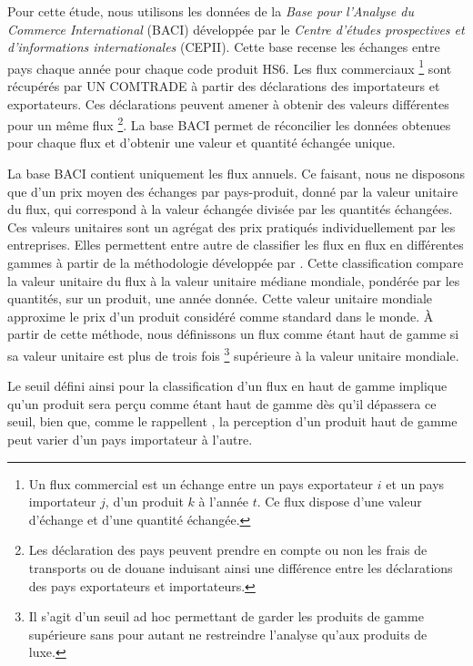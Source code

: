 \documentclass[french,10pt,a4paper]{article}
\begin{document}
\bigskip

Pour cette étude, nous utilisons les données de la \textit{Base pour l'Analyse du Commerce International} (BACI) \citep{Gaulier2010} développée par le \textit{Centre d'études prospectives et d'informations internationales} (CEPII). Cette base recense les échanges entre pays chaque année pour chaque code produit HS6. Les flux commerciaux \footnote{Un flux commercial est un échange entre un pays exportateur $i$ et un pays importateur $j$, d'un produit $k$ à l'année $t$. Ce flux dispose d'une valeur d'échange et d'une quantité échangée.} sont récupérés par UN COMTRADE à partir des déclarations des importateurs et exportateurs. Ces déclarations peuvent amener à obtenir des valeurs différentes pour un même flux \footnote{Les déclaration des pays peuvent prendre en compte ou non les frais de transports ou de douane induisant ainsi une différence entre les déclarations des pays exportateurs et importateurs.}. La base BACI permet de réconcilier les données obtenues pour chaque flux et d'obtenir une valeur et quantité échangée unique.

La base BACI contient uniquement les flux annuels. Ce faisant, nous ne disposons que d'un prix moyen des échanges par pays-produit, donné par la valeur unitaire du flux, qui correspond à la valeur échangée divisée par les quantités échangées. Ces valeurs unitaires sont un agrégat des prix pratiqués individuellement par les entreprises. Elles permettent entre autre de classifier les flux en flux en différentes gammes à partir de la méthodologie développée par \cite{Fontagne1997}. Cette classification compare la valeur unitaire du flux à la valeur unitaire médiane mondiale, pondérée par les quantités, sur un produit, une année donnée. Cette valeur unitaire mondiale approxime le prix d'un produit considéré comme standard dans le monde. À partir de cette méthode, nous définissons un flux comme étant haut de gamme si sa valeur unitaire est plus de trois fois \footnote{Il s'agit d'un seuil ad hoc permettant de garder les produits de gamme supérieure sans pour autant ne restreindre l'analyse qu'aux produits de luxe.} supérieure à la valeur unitaire mondiale. 

Le seuil défini ainsi pour la classification d'un flux en haut de gamme implique qu'un produit sera perçu comme étant haut de gamme dès qu'il dépassera ce seuil, bien que, comme le rappellent \cite{Martin2015}, la perception d'un produit haut de gamme peut varier d'un pays importateur à l'autre.
\end{document}
